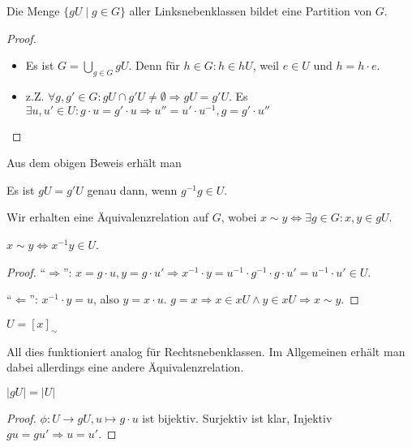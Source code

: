 \begin{lemma}
    Die Menge $\{gU \mid g \in G\}$ aller Linksnebenklassen bildet eine Partition von $G$.
\end{lemma}
\begin{proof}\phantom{.}
    \begin{itemize}
        \item Es ist $G = \bigcup_{g \in G} gU$. Denn für $h \in G: h \in hU$, weil $e \in U$ und $h = h \cdot e$.
        \item z.Z. $\forall g, g' \in G: gU \cap g'U \not= \emptyset \Rightarrow gU = g'U$. Es $\exists u, u' \in U: g\cdot u = g'\cdot u \Rightarrow u'' = u' \cdot u^{-1}, g = g' \cdot u''$ 
    \end{itemize}
    
\end{proof}

Aus dem obigen Beweis erhält man 
\begin{corollary}
    Es ist $gU = g'U$ genau dann, wenn $g^{-1}g \in U$.
\end{corollary}

\begin{corollary}
    Wir erhalten eine Äquivalenzrelation auf $G$, wobei $x \sim y \Leftrightarrow \exists g \in G: x,y \in gU$.
\end{corollary}

\begin{lemma}
    $x \sim y \Leftrightarrow x^{-1}y \in U$. 
\end{lemma}
\begin{proof}
    ``$\Rightarrow$'': $x = g\cdot u, y = g\cdot u' \Rightarrow x^{-1}\cdot y = u^{-1}\cdot g^{-1} \cdot g \cdot u' = u^{-1} \cdot u' \in U$.

    ``$\Leftarrow$'': $x^{-1}\cdot y = u$, also $y = x\cdot u$. $g = x \Rightarrow x \in xU \land y \in xU \Rightarrow x \sim y$. 
\end{proof}

\begin{lemma}
    $U = [x]_{\sim}$
\end{lemma}

All dies funktioniert analog für Rechtsnebenklassen. Im Allgemeinen erhält man dabei allerdings eine andere Äquivalenzrelation.

\begin{lemma}
    $\vert gU \vert = \vert U \vert$
\end{lemma}
\begin{proof}
    $\phi: U \to gU, u \mapsto g\cdot u$ ist bijektiv. Surjektiv ist klar, Injektiv $gu = gu' \Rightarrow u = u'$.
\end{proof}

